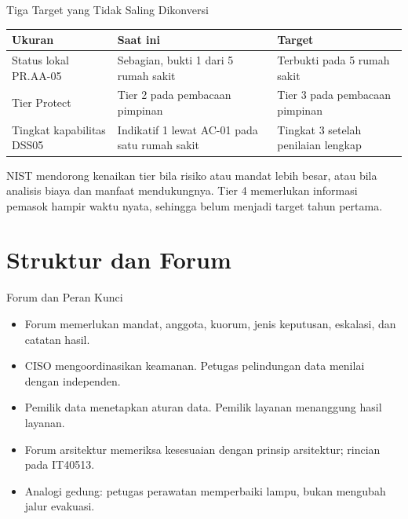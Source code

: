 \documentclass[aspectratio=169, table, 12pt]{beamer}
\begin{document}
\begin{frame}{{\Large Tiga Target yang Tidak Saling Dikonversi}}
  \vspace{4pt}
  \footnotesize
  \begin{tabularx}{\textwidth}{|>{\raggedright\arraybackslash}p{}|>{\raggedright\arraybackslash}X|>{\raggedright\arraybackslash}X|}
    \hline
    \textbf{Ukuran} & \textbf{Saat ini} & \textbf{Target} \\ \hline
    Status lokal PR.AA-05 & Sebagian, bukti 1 dari 5 rumah sakit & Terbukti pada 5 rumah sakit \\
    \hline
    Tier Protect & Tier 2 pada pembacaan pimpinan & Tier 3 pada pembacaan pimpinan \\ \hline
    Tingkat kapabilitas DSS05 & Indikatif 1 lewat AC-01 pada satu rumah sakit & Tingkat 3 setelah
    penilaian lengkap \\ \hline
  \end{tabularx}

  \vspace{8pt}
  \small NIST mendorong kenaikan tier bila risiko atau mandat lebih besar, atau bila analisis biaya
  dan manfaat mendukungnya. Tier 4 memerlukan informasi pemasok hampir waktu nyata, sehingga belum
  menjadi target tahun pertama.
\end{frame}

\section{Struktur dan Forum}

\begin{frame}{{\Large Forum dan Peran Kunci}}
  \vspace{6pt}
  \small
  \begin{itemize}
    \item Forum memerlukan mandat, anggota, kuorum, jenis keputusan, eskalasi, dan catatan hasil.
    \item CISO mengoordinasikan keamanan. Petugas pelindungan data menilai dengan independen.
    \item Pemilik data menetapkan aturan data. Pemilik layanan menanggung hasil layanan.
    \item Forum arsitektur memeriksa kesesuaian dengan prinsip arsitektur; rincian pada IT40513.
    \item Analogi gedung: petugas perawatan memperbaiki lampu, bukan mengubah jalur evakuasi.
  \end{itemize}
\end{frame}
\end{document}
